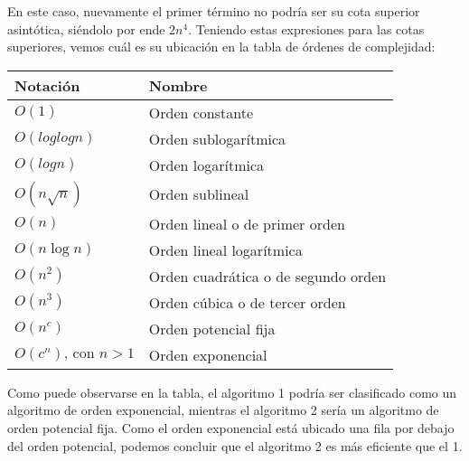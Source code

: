 En este caso, nuevamente el primer término no podría ser su cota superior asintótica, siéndolo por ende $2n^4$.
Teniendo estas expresiones para las cotas superiores, vemos cuál es su ubicación en la tabla de órdenes de complejidad:

\clearpage

\begin{table}[hbt!]
    \centering
    \begin{tabular}{ll}
        Notación                     & Nombre                              \\
        \hline
        $O(1)$                       & Orden constante                     \\
        $O(log log n)$               & Orden sublogarítmica                \\
        $O(log n)$                   & Orden logarítmica                   \\
        $O( n \sqrt{n})$             & Orden sublineal                     \\
        $O(n)$                       & Orden lineal o de primer orden      \\
        $O(n \log n)$                & Orden lineal logarítmica            \\
        $O(n^2)$                     & Orden cuadrática o de segundo orden \\
        $O(n^3)$                     & Orden cúbica o de tercer orden      \\
        $O(n^c)$                     & Orden potencial fija                \\
        $O(c^n) \text{, con } n > 1$ & Orden exponencial                   \\
        \hline
    \end{tabular}
\end{table}

Como puede observarse en la tabla, el algoritmo 1 podría ser clasificado como un algoritmo de orden exponencial, mientras el algoritmo 2 sería un algoritmo 
de orden potencial fija. Como el orden exponencial está ubicado una fila por debajo del orden potencial, podemos concluir que el algoritmo 2 es más eficiente 
que el 1.
